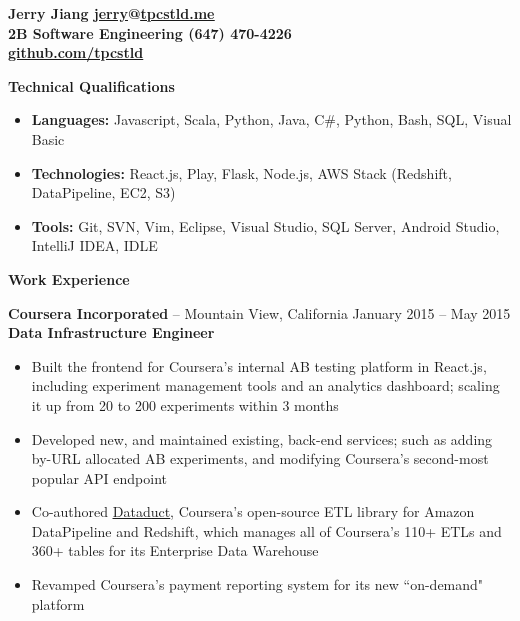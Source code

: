 \documentclass{letter}
\begin{document}
  \thispagestyle{empty}


{\bfseries
  {\Large Jerry Jiang} \hfill \href{mailto:jerry@tpcstld.me}{\uline{jerry}}@\href{//tpcstld.me}{\uline{tpcstld.me}} \\
  2B Software Engineering \hfill (647) 470-4226 \\
\null \hfill \href{https://github.com/tpcstld}{\uline{github.com/tpcstld}}} \\
\null \hrulefill

{\bfseries \Large Technical Qualifications}
\vspace{-3mm}
\begin{itemize}
    \item {\bfseries Languages:}
        Javascript, Scala, Python, Java, C\#, Python, Bash, SQL, Visual Basic
    \item {\bfseries Technologies:}
        React.js, Play, Flask, Node.js, AWS Stack (Redshift, DataPipeline, EC2, S3)
    \item {\bfseries Tools:}
        Git, SVN, Vim, Eclipse, Visual Studio, SQL Server, Android Studio, IntelliJ IDEA, IDLE
\end{itemize}

{\bfseries \Large Work Experience}

\vspace{-1.5mm}
{\bfseries Coursera Incorporated} -- Mountain View, California \hfill January 2015 -- May 2015 \\
{\bfseries Data Infrastructure Engineer}
\vspace{-3mm}
\begin{itemize}
    \item Built the frontend for Coursera's internal AB testing platform in React.js, including
      experiment management tools and an analytics dashboard; scaling it up from 20 to
      200 experiments within 3 months
    \item Developed new, and maintained existing, back-end services; such as adding by-URL allocated
      AB experiments, and modifying Coursera's second-most popular API endpoint
    \item Co-authored \href{https://github.com/coursera/dataduct}{\uline{Dataduct}},
      Coursera's open-source ETL library for Amazon DataPipeline and
      Redshift, which manages all of Coursera's 110+ ETLs and 360+ tables for its Enterprise Data Warehouse
    \item Revamped Coursera's payment reporting system for its new ``on-demand" platform
\end{itemize}
\end{document}
